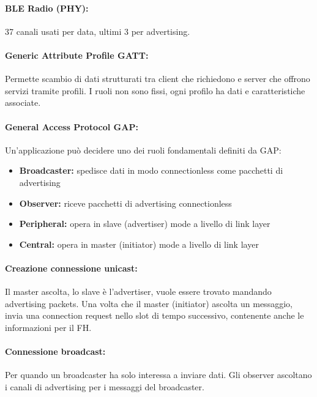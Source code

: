 \paragraph{BLE Radio (PHY):} 37 canali usati per data, ultimi 3 per advertising.

\paragraph{Generic Attribute Profile GATT:} Permette scambio di dati strutturati tra client che richiedono e server che offrono servizi tramite profili. I ruoli non sono fissi, ogni profilo ha dati e caratteristiche associate.

\paragraph{General Access Protocol GAP:} Un'applicazione può decidere uno dei ruoli fondamentali definiti da GAP: 
\begin{itemize}
    \item \textbf{Broadcaster:} spedisce dati in modo connectionless come pacchetti di advertising
    
    \item \textbf{Observer:} riceve pacchetti di advertising connectionless
    
    \item \textbf{Peripheral:} opera in slave (advertiser) mode a livello di link layer 
    
    \item \textbf{Central:} opera in master (initiator) mode a livello di link layer
\end{itemize}

\paragraph{Creazione connessione unicast:} Il master ascolta, lo slave è l'advertiser, vuole essere trovato mandando advertising packets. Una volta che il master (initiator) ascolta un messaggio, invia una connection request nello slot di tempo successivo, contenente anche le informazioni per il FH. 

\paragraph{Connessione broadcast:} Per quando un broadcaster ha solo interessa a inviare dati. Gli observer ascoltano i canali di advertising per i messaggi del broadcaster.

